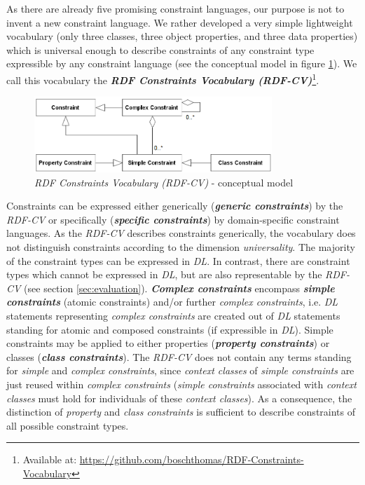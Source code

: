 \documentclass{llncs}
\begin{document}
As there are already five promising constraint languages, our purpose is not to invent a new constraint language.
We rather developed a very simple lightweight vocabulary (only three classes, three object properties, and three data properties) which is universal enough to describe constraints of any constraint type expressible by any constraint language (see the conceptual model in figure \ref{fig:RDF-CV-conceptual-model}).
We call this vocabulary the \textbf{\emph{RDF Constraints Vocabulary (RDF-CV)}}\footnote{Available at: \url{https://github.com/boschthomas/RDF-Constraints-Vocabulary}}.

\begin{figure}
	\centering
		\includegraphics[width=0.80\textwidth]{images/RDF-CV-conceptual-model.png}
	\caption{\emph{RDF Constraints Vocabulary (RDF-CV)} - conceptual model}
	\label{fig:RDF-CV-conceptual-model}
\end{figure}

Constraints can be expressed either generically (\textbf{\emph{generic constraints}}) by the \emph{RDF-CV}   
or specifically (\textbf{\emph{specific constraints}}) by domain-specific constraint languages.
As the \emph{RDF-CV} describes constraints generically, the vocabulary does not distinguish constraints according to the dimension \emph{universality}. 
The majority of the constraint types can be expressed in \emph{DL}.
In contrast, there are constraint types which cannot be expressed in \emph{DL}, but are also representable by the \emph{RDF-CV} (see section \ref{sec:evaluation}). 
\textbf{\emph{Complex constraints}} encompass \textbf{\emph{simple constraints}} (atomic constraints) and/or further \emph{complex constraints},
i.e. \emph{DL} statements representing \emph{complex constraints} are created out of \emph{DL} statements standing for atomic and composed constraints (if expressible in \emph{DL}). 
Simple constraints may be applied to either properties (\textbf{\emph{property constraints}}) or classes (\textbf{\emph{class constraints}}).
The \emph{RDF-CV} does not contain any terms standing for \emph{simple} and \emph{complex constraints}, since \emph{context classes} of \emph{simple constraints} are just reused within \emph{complex constraints} (\emph{simple constraints} associated with \emph{context classes} must hold for individuals of these \emph{context classes}).
As a consequence, the distinction of \emph{property} and \emph{class constraints} is sufficient to describe constraints of all possible constraint types.
\end{document}
